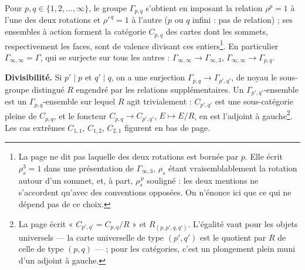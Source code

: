 \documentclass[11pt,a4paper]{article}
\begin{document}
Pour $p, q \in \{1, 2, \ldots, \infty\}$, le groupe $\Gamma_{p,q}$ s'obtient en
imposant la relation $\rho^{p} = 1$ à l'une des deux rotations et $\rho'^{\,q} = 1$ à
l'autre ($p$ ou $q$ infini : pas de relation) ; ses
ensembles à action forment la catégorie $C_{p,q}$ des cartes dont les sommets,
respectivement les faces, sont de valence divisant ces entiers\footnote{La page
ne dit pas laquelle des deux rotations est bornée par $p$. Elle écrit
$\rho_s^3 = 1$ dans une présentation de $\Gamma_{\infty,3}$, $\rho_s$ étant
vraisemblablement la rotation autour d'un sommet, et, à part, $\rho_s^{\,p}$
souligné : les deux mentions ne s'accordent qu'avec des conventions opposées.
On n'énonce ici que ce qui ne dépend pas de ce choix.}. En particulier
$\Gamma_{\infty,\infty} = \Gamma$, qui se surjecte sur tous les autres :
$\Gamma_{\infty,\infty} \to \Gamma_{\infty,3}$, $\Gamma_{\infty,\infty} \to \Gamma_{p,q}$.

\textbf{Divisibilité.} Si $p' \mid p$ et $q' \mid q$, on a une surjection
$\Gamma_{p,q} \to \Gamma_{p',q'}$, de noyau le sous-groupe distingué $R$ engendré par
les relations supplémentaires. Un $\Gamma_{p',q'}$-ensemble est un
$\Gamma_{p,q}$-ensemble sur lequel $R$ agit trivialement : $C_{p',q'}$ est une
sous-catégorie pleine de $C_{p,q}$, et le foncteur $C_{p,q} \to C_{p',q'}$,
$E \mapsto E/R$, en est l'adjoint à gauche\footnote{La page écrit
« $C_{p',q'} = C_{p,q}/R$ » et $R_{(p,p',q,q')}$. L'égalité vaut pour les
objets universels — la carte universelle de type $(p', q')$ est le quotient par
$R$ de celle de type $(p, q)$ — ; pour les catégories, c'est un plongement plein
muni d'un adjoint à gauche.}. Les cas extrêmes $C_{1,1}$, $C_{1,2}$, $C_{2,1}$
figurent en bas de page.
\end{document}
